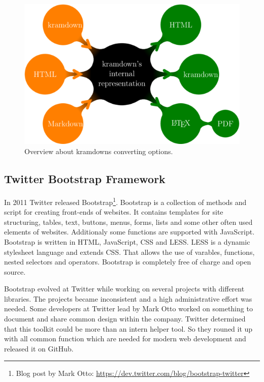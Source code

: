 \begin{figure}[htb]
\centering
\includegraphics[width=\textwidth]{figures/kramdown}
\caption{Overview about kramdowns converting options. \cite{kramdown}}
\label{fig:kramdown}
\end{figure}

\subsection{Twitter Bootstrap Framework}
In 2011 Twitter released Bootstrap\footnote{Blog post by Mark Otto: \url{https://dev.twitter.com/blog/bootstrap-twitter}}. Bootstrap is a collection of methods and script for creating front-ends of websites. It contains templates for site structuring, tables, text, buttons, menus, forms, lists and some other often used elements of websites. Additionaly some functions are supported with JavaScript. Bootstrap is written in HTML, JavaScript, CSS and LESS. LESS is a dynamic stylesheet language and extends CSS. That allows the use of varables, functions, nested selectors and operators.\cite{less} Bootstrap is completely free of charge and open source. \cite{bootstrap}

Bootstrap evolved at Twitter while working on several projects with different libraries. The projects became inconsistent and a high administrative effort was needed. Some developers at Twitter lead by Mark Otto worked on something to document and share common design within the company. Twitter determined that this toolkit could be more than an intern helper tool. So they rouned it up with all common function which are needed for modern web development and released it on GitHub. \cite{markotto}

